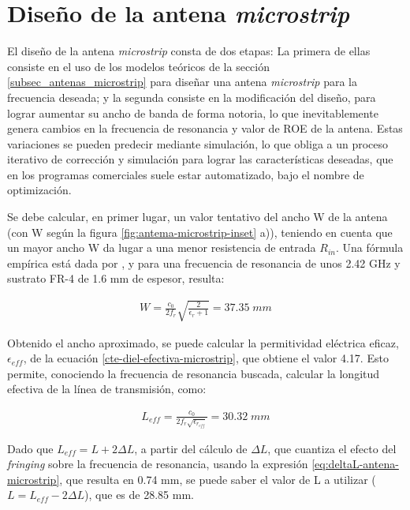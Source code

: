 \section{Diseño de la antena \textit{microstrip}}
\label{sec_disenio_microstrip}
El diseño de la antena \textit{microstrip} consta de dos etapas: La primera de ellas consiste en el uso de los modelos teóricos de la sección \ref{subsec_antenas_microstrip} para diseñar una antena \textit{microstrip} para la frecuencia deseada; y la segunda consiste en la modificación del diseño, para lograr aumentar su ancho de banda de forma notoria, lo que inevitablemente genera cambios en la frecuencia de resonancia y valor de ROE de la antena. Estas variaciones se pueden predecir mediante simulación, lo que obliga a un proceso iterativo de corrección y simulación para lograr las características deseadas, que en los programas comerciales suele estar automatizado, bajo el nombre de optimización.

Se debe calcular, en primer lugar, un valor tentativo del ancho W de la antena (con W según la figura \ref{fig:antema-microstrip-inset} a)), teniendo en cuenta que un mayor ancho W da lugar a una menor resistencia de entrada $R_{in}$. Una fórmula empírica está dada por \cite{Barthia:Handbook}, y para una frecuencia de resonancia de unos 2.42 GHz y sustrato FR-4 de 1.6 mm de espesor, resulta:

\begin{align}
	W = \frac{c_0}{2 f_r} \sqrt{\frac{2}{\epsilon_r+1}} = 37.35\; mm
\end{align}

Obtenido el ancho aproximado, se puede calcular la permitividad eléctrica eficaz, $\epsilon_{eff}$, de la ecuación \ref{cte-diel-efectiva-microstrip}, que obtiene el valor 4.17. Esto permite, conociendo la frecuencia de resonancia buscada, calcular la longitud efectiva de la línea de transmisión, como:

\begin{align}
	L_{eff} = \frac{c_0}{2 f_r \sqrt{\epsilon_{r_{eff}}}} = 30.32\; mm
\end{align}

Dado que $L_{eff} = L + 2 \Delta L$, a partir del cálculo de $\Delta L$, que cuantiza el efecto del \textit{fringing} sobre la frecuencia de resonancia, usando la expresión \ref{eq:deltaL-antena-microstrip}, que resulta en 0.74 mm, se puede saber el valor de L a utilizar ($L = L_{eff} - 2 \Delta L$), que es de 28.85 mm.

